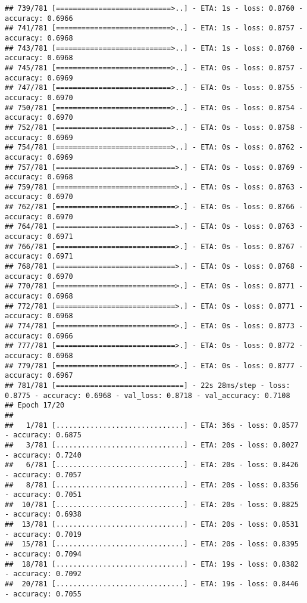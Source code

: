 \documentclass[
]{article}
\begin{document}
\begin{verbatim}
## 739/781 [===========================>..] - ETA: 1s - loss: 0.8760 - accuracy: 0.6966
## 741/781 [===========================>..] - ETA: 1s - loss: 0.8757 - accuracy: 0.6968
## 743/781 [===========================>..] - ETA: 1s - loss: 0.8760 - accuracy: 0.6968
## 745/781 [===========================>..] - ETA: 0s - loss: 0.8757 - accuracy: 0.6969
## 747/781 [===========================>..] - ETA: 0s - loss: 0.8755 - accuracy: 0.6970
## 750/781 [===========================>..] - ETA: 0s - loss: 0.8754 - accuracy: 0.6970
## 752/781 [===========================>..] - ETA: 0s - loss: 0.8758 - accuracy: 0.6969
## 754/781 [===========================>..] - ETA: 0s - loss: 0.8762 - accuracy: 0.6969
## 757/781 [============================>.] - ETA: 0s - loss: 0.8769 - accuracy: 0.6968
## 759/781 [============================>.] - ETA: 0s - loss: 0.8763 - accuracy: 0.6970
## 762/781 [============================>.] - ETA: 0s - loss: 0.8766 - accuracy: 0.6970
## 764/781 [============================>.] - ETA: 0s - loss: 0.8763 - accuracy: 0.6971
## 766/781 [============================>.] - ETA: 0s - loss: 0.8767 - accuracy: 0.6971
## 768/781 [============================>.] - ETA: 0s - loss: 0.8768 - accuracy: 0.6970
## 770/781 [============================>.] - ETA: 0s - loss: 0.8771 - accuracy: 0.6968
## 772/781 [============================>.] - ETA: 0s - loss: 0.8771 - accuracy: 0.6968
## 774/781 [============================>.] - ETA: 0s - loss: 0.8773 - accuracy: 0.6966
## 777/781 [============================>.] - ETA: 0s - loss: 0.8772 - accuracy: 0.6968
## 779/781 [============================>.] - ETA: 0s - loss: 0.8777 - accuracy: 0.6967
## 781/781 [==============================] - 22s 28ms/step - loss: 0.8775 - accuracy: 0.6968 - val_loss: 0.8718 - val_accuracy: 0.7108
## Epoch 17/20
## 
##   1/781 [..............................] - ETA: 36s - loss: 0.8577 - accuracy: 0.6875
##   3/781 [..............................] - ETA: 20s - loss: 0.8027 - accuracy: 0.7240
##   6/781 [..............................] - ETA: 20s - loss: 0.8426 - accuracy: 0.7057
##   8/781 [..............................] - ETA: 20s - loss: 0.8356 - accuracy: 0.7051
##  10/781 [..............................] - ETA: 20s - loss: 0.8825 - accuracy: 0.6938
##  13/781 [..............................] - ETA: 20s - loss: 0.8531 - accuracy: 0.7019
##  15/781 [..............................] - ETA: 20s - loss: 0.8395 - accuracy: 0.7094
##  18/781 [..............................] - ETA: 19s - loss: 0.8382 - accuracy: 0.7092
##  20/781 [..............................] - ETA: 19s - loss: 0.8446 - accuracy: 0.7055

\end{verbatim}
\end{document}

